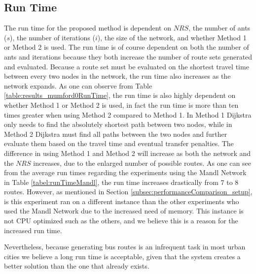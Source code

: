 \subsection{Run Time}
\label{subsec:runtime}

The run time for the proposed method is dependent on $NRS$, the number of ants ($s$), the number of iterations ($i$), the size of the network, and whether Method 1 or Method 2 is used. The run time is of course dependent on both the number of ants and iterations because they both increase the number of route sets generated and evaluated. Because a route set must be evaluated on the shortest travel time between every two nodes in the network, the run time also increases as the network expands. As one can observe from Table \vref{table:results_mumford0RunTime}, the run time is also highly dependent on whether Method 1 or Method 2 is used, in fact the run time is more than ten times greater when using Method 2 compared to Method 1. In Method 1 Dijkstra only needs to find the absolutely shortest path between two nodes, while in Method 2 Dijkstra must find all paths between the two nodes and further evaluate them based on the travel time and eventual transfer penalties. The difference in using Method 1 and Method 2 will increase as both the network and the $NRS$ increases, due to the enlarged number of possible routes. As one can see from the average run times regarding the experiments using the Mandl Network in Table \vref{tabel:runTimeMandl}, the run time increases drastically from 7 to 8 routes. However, as mentioned in Section \vref{subsec:performanceComparison_setup}, is this experiment ran on a different instance than the other experiments who used the Mandl Network due to the increased need of memory. This instance is not CPU optimized such as the others, and we believe this is a reason for the increased run time. 

Nevertheless, because generating bus routes is an infrequent task in most urban cities we believe a long run time is acceptable, given that the system creates a better solution than the one that already exists.  




